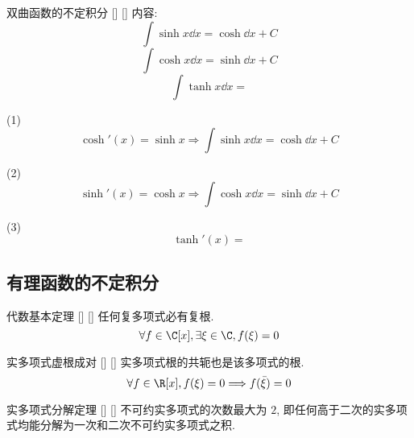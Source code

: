 \documentclass[UTF8]{ctexart}
\begin{document}
			\begin{xmp}
			    []
			    {双曲函数的不定积分}
			    []
			    []
				内容: 
				\[\int\sinh x\dd x=\cosh\dd x+C\]
				\[\int\cosh x\dd x=\sinh\dd x+C\]
				\[\int\tanh x\dd x=\]
			\end{xmp}
			
			\begin{prf}
				
				(1)\[\cosh'(x)=\sinh x\Longrightarrow\int\sinh x\dd x=\cosh\dd x+C\]
				
				(2)\[\sinh'(x)=\cosh x\Longrightarrow\int\cosh x\dd x=\sinh\dd x+C\]
				
				(3)\[\tanh'(x)=\]

                \end{prf}
				
		\subsection{有理函数的不定积分}

			\begin{thm}
			    []
			    {代数基本定理}
			    []
			    []
				任何复多项式必有复根. 
				\[\forall f\in\C[x], \exists\xi\in\C, f(\xi)=0\]
			\end{thm}

			\begin{lma}
			    []
			    {实多项式虚根成对}
			    []
			    []
				实多项式根的共轭也是该多项式的根. 
				\[\forall f\in\R[x], f(\xi)=0\Longrightarrow f(\bar{\xi})=0\]
			\end{lma}

			\begin{thm}
			    []
			    {实多项式分解定理}
			    []
			    []
				不可约实多项式的次数最大为 \(2\), 即任何高于二次的实多项式均能分解为一次和二次不可约实多项式之积. 
			\end{thm}
\end{document}
